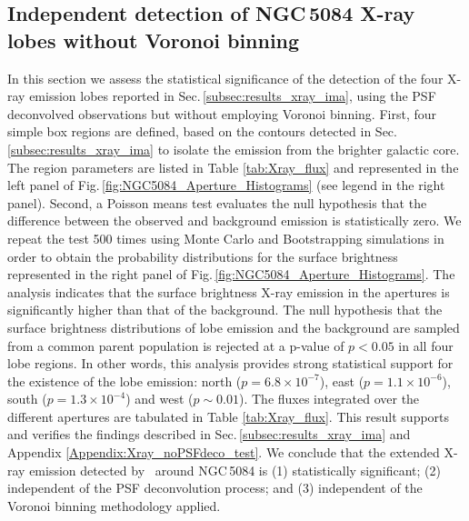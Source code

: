 \documentclass[modern]{CORE-AAS/aastex631}
\begin{document}
\subsection{Independent detection of NGC\,5084 X-ray lobes without Voronoi binning}
\label{Appendix:Xray_novoro_test}
In this section we assess the statistical significance of the detection of the four X-ray emission lobes reported in Sec.\,\ref{subsec:results_xray_ima}, using the PSF deconvolved observations but without employing Voronoi binning. First, four simple box regions are defined, based on the contours detected in Sec.\,\ref{subsec:results_xray_ima} to isolate the emission from the brighter galactic core. The region parameters are listed in Table \ref{tab:Xray_flux} and represented in the left panel of Fig.\,\ref{fig:NGC5084_Aperture_Histograms} (see legend in the right panel). Second, a Poisson means test \citep[$E$-test, ][]{KRISHNAMOORTHY200423} evaluates the null hypothesis that the difference between the observed and background emission is statistically zero. We repeat the test 500 times using Monte Carlo and Bootstrapping simulations in order to obtain the probability distributions for the surface brightness represented in the right panel of Fig.\,\ref{fig:NGC5084_Aperture_Histograms}.
The analysis indicates that the surface brightness X-ray emission in the apertures is significantly higher than that of the background. The null hypothesis that the surface brightness distributions of lobe emission and the background are sampled from a common parent population is rejected at a p-value of $p<0.05$ in all four lobe regions. In other words, this analysis provides strong statistical support for the existence of the lobe emission: north ($p=6.8\times10^{-7}$), east ($p=1.1\times10^{-6}$), south ($p=1.3\times10^{-4}$) and west ($p\sim0.01$). The fluxes integrated over the different apertures are tabulated in Table \ref{tab:Xray_flux}. This result supports and verifies the findings described in Sec.\,\ref{subsec:results_xray_ima} and Appendix \ref{Appendix:Xray_noPSFdeco_test}. We conclude that the extended X-ray emission detected by \SAUNAS\ around NGC\,5084 is (1) statistically significant; (2) independent of the PSF deconvolution process; and  (3) independent of the Voronoi binning methodology applied.
\end{document}

